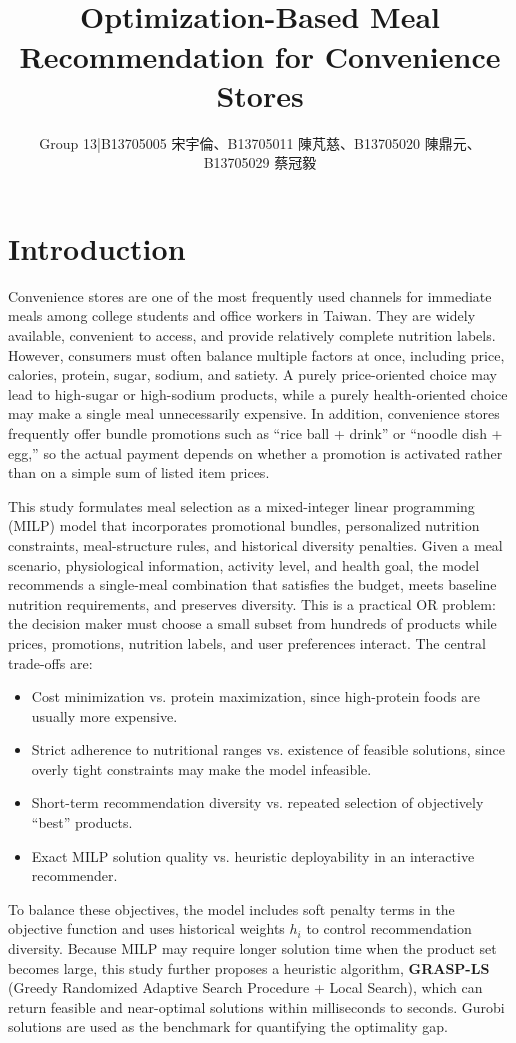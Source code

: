 \documentclass[a4paper]{article}
\title{\vspace{-1.2cm}{\fontsize{14}{17}\selectfont\bfseries 114-2 Operations Research Final Project}\\[8pt]
{\fontsize{14}{16}\selectfont\bfseries Optimization-Based Meal Recommendation for Convenience Stores}}
\author{\fontsize{10}{13}\selectfont Group 13\;|\;B13705005 宋宇倫、B13705011 陳芃慈、B13705020 陳鼎元、B13705029 蔡冠毅}
\date{}
\begin{document}
\maketitle
\vspace{-0.5cm}

\section{Introduction}
Convenience stores are one of the most frequently used channels for immediate meals among college students and office workers in Taiwan. They are widely available, convenient to access, and provide relatively complete nutrition labels. However, consumers must often balance multiple factors at once, including price, calories, protein, sugar, sodium, and satiety. A purely price-oriented choice may lead to high-sugar or high-sodium products, while a purely health-oriented choice may make a single meal unnecessarily expensive. In addition, convenience stores frequently offer bundle promotions such as ``rice ball + drink'' or ``noodle dish + egg,'' so the actual payment depends on whether a promotion is activated rather than on a simple sum of listed item prices.

This study formulates meal selection as a mixed-integer linear programming (MILP) model that incorporates promotional bundles, personalized nutrition constraints, meal-structure rules, and historical diversity penalties. Given a meal scenario, physiological information, activity level, and health goal, the model recommends a single-meal combination that satisfies the budget, meets baseline nutrition requirements, and preserves diversity. This is a practical OR problem: the decision maker must choose a small subset from hundreds of products while prices, promotions, nutrition labels, and user preferences interact. The central trade-offs are:
\begin{itemize}
\item Cost minimization vs. protein maximization, since high-protein foods are usually more expensive.
\item Strict adherence to nutritional ranges vs. existence of feasible solutions, since overly tight constraints may make the model infeasible.
\item Short-term recommendation diversity vs. repeated selection of objectively ``best'' products.
\item Exact MILP solution quality vs. heuristic deployability in an interactive recommender.
\end{itemize}
To balance these objectives, the model includes soft penalty terms in the objective function and uses historical weights $h_i$ to control recommendation diversity. Because MILP may require longer solution time when the product set becomes large, this study further proposes a heuristic algorithm, \textbf{GRASP-LS} (Greedy Randomized Adaptive Search Procedure + Local Search), which can return feasible and near-optimal solutions within milliseconds to seconds. Gurobi solutions are used as the benchmark for quantifying the optimality gap.
\end{document}
